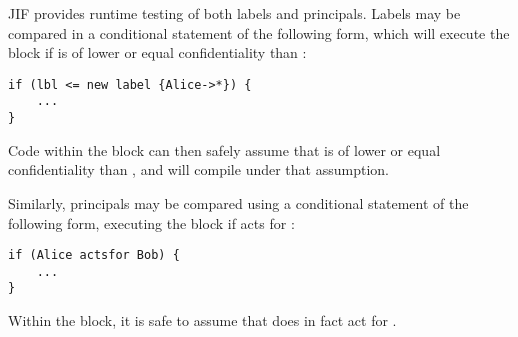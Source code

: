 JIF provides runtime testing of both labels and principals. Labels may be compared in a conditional statement of the following form, which will execute the block if  is of lower or equal confidentiality than :

\begin{verbatim}
if (lbl <= new label {Alice->*}) {
	...
}
\end{verbatim}

Code within the block can then safely assume that  is of lower or equal confidentiality than , and will compile under that assumption.

Similarly, principals may be compared using a conditional statement of the following form, executing the block if  acts for :

\begin{verbatim}
if (Alice actsfor Bob) {
	...
}
\end{verbatim}

Within the block, it is safe to assume that  does in fact act for .